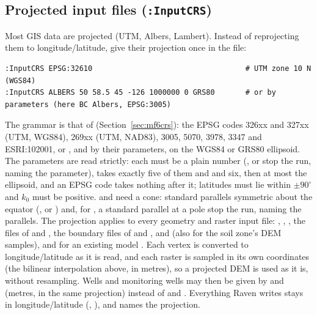 \subsection{Projected input files (\texttt{:InputCRS})}\label{sec:inputcrs}
Most GIS data are projected (UTM, Albers, Lambert). Instead of reprojecting them to longitude/latitude, give their
projection once in the  file:
\begin{lstlisting}
:InputCRS EPSG:32610                                   # UTM zone 10 N (WGS84)
:InputCRS ALBERS 50 58.5 45 -126 1000000 0 GRS80       # or by parameters (here BC Albers, EPSG:3005)
\end{lstlisting}
The grammar is that of  (Section~\ref{sec:mf6crs}): the EPSG codes 326xx and 327xx (UTM, WGS84), 269xx (UTM, NAD83),
3005, 5070, 3978, 3347 and ESRI:102001, or ,  and  by their parameters, on the WGS84 or GRS80
ellipsoid. The parameters are read strictly: each must be a plain number (,  or  stop
the run, naming the parameter),  takes exactly five of them and  and  six, then at most
the ellipsoid, and an EPSG code takes nothing after it; latitudes must lie within $\pm90^\circ$ and $k_0$ must be
positive.  and  need a cone: standard parallels symmetric about the equator (, or
) and, for , a standard parallel at a pole stop the run, naming the parallels. The projection applies to every geometry and raster input file: , ,
, the files of  and , the boundary files of
 and ,  and  (also for the
soil zone's DEM samples), and for an existing model . Each vertex is converted to longitude/latitude as
it is read, and each raster is sampled in its own coordinates (the bilinear interpolation above, in metres), so a
projected DEM is used as it is, without resampling. Wells and monitoring wells may then be given by  and 
(metres, in the same projection) instead of  and . Everything Raven writes stays in
longitude/latitude (, ), and  names the projection.

